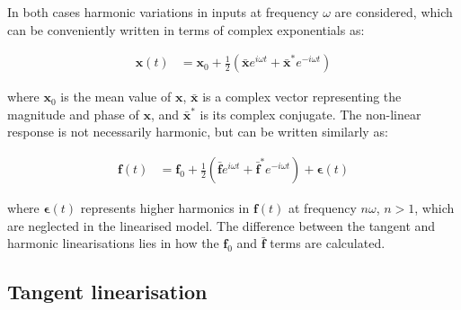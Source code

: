 \documentclass[a4paper,preprint]{elsarticle}
\begin{document}
In both cases harmonic variations in inputs at frequency $\omega{}$ are considered,
which can be conveniently written in terms of complex exponentials as:
\begin{linenomath}\begin{align}
  \label{eq:139}
  \boldsymbol{x}(t) &= \boldsymbol{x}_0 + \frac{1}{2} \left( \bar{\boldsymbol{x}} e^{i\omega{}t} + \bar{\boldsymbol{x}}^* e^{-i\omega{}t} \right)
\end{align}\end{linenomath}
where $\boldsymbol{x}_0$ is the mean value of $\boldsymbol{x}$, $\bar{\boldsymbol{x}}$ is a complex vector representing
the magnitude and phase of $\boldsymbol{x}$, and $\bar{\boldsymbol{x}}^*$ is its complex conjugate. The
non-linear response is not necessarily harmonic, but can be written similarly
as:
\begin{linenomath}\begin{align}
  \label{eq:140}
  \boldsymbol{f}(t) &= \boldsymbol{f}_0 + \frac{1}{2} \left( \bar{\boldsymbol{f}} e^{i\omega{}t} +
         \bar{\boldsymbol{f}}^* e^{-i\omega{}t} \right) + \boldsymbol{\epsilon}(t)
\end{align}\end{linenomath}
where $\boldsymbol{\epsilon}(t)$ represents higher harmonics in
$\boldsymbol{f}(t)$ at frequency $n\omega{}$, $n > 1$, which are neglected in
the linearised model. The difference between the tangent and harmonic
linearisations lies in how the $\boldsymbol{f}_0$ and $\bar{\boldsymbol{f}}$
terms are calculated.

\subsection{Tangent linearisation}
\label{sec:tangent}
\end{document}
